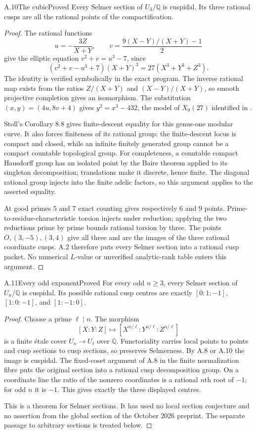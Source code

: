 \begin{statement}{A.10}{The cubic}{Proved}
Every Selmer section of $U_3/\mathbb Q$ is cuspidal. Its three rational
cusps are all the rational points of the compactification.
\end{statement}
\begin{proof}
The rational functions
\[
 u=-\frac{3Z}{X+Y},\qquad
 v=\frac{9(X-Y)/(X+Y)-1}{2}
\]
give the elliptic equation $v^2+v=u^3-7$, since
\[
 (v^2+v-u^3+7)(X+Y)^3=27(X^3+Y^3+Z^3).
\]
The identity is verified symbolically in the exact program. The inverse
rational map exists from the ratios $Z/(X+Y)$ and $(X-Y)/(X+Y)$, so
smooth projective completion gives an isomorphism. The substitution
$(x,y)=(4u,8v+4)$ gives $y^2=x^3-432$, the model of $X_0(27)$ identified
in \citet[\S10.1]{AMKrizLi2019}.

Stoll's Corollary 8.8 gives finite-descent equality for this genus-one
modular curve. It also forces finiteness of its rational group: the
finite-descent locus is compact and closed, while an infinite finitely
generated group cannot be a compact countable topological group. For
completeness, a countable compact Hausdorff group has an isolated point by
the Baire theorem applied to its singleton decomposition; translations
make it discrete, hence finite. The diagonal rational group injects into
the finite adelic factors, so this argument applies to the asserted
equality.

At good primes $5$ and $7$ exact counting gives respectively $6$ and $9$
points. Prime-to-residue-characteristic torsion injects under reduction;
applying the two reductions prime by prime bounds rational torsion by
three. The points $O,(3,-5),(3,4)$ give all three and are the images of
the three rational coordinate cusps. A.2 therefore puts every Selmer
section into a rational cusp packet. No numerical $L$-value or unverified
analytic-rank table enters this argument.
\end{proof}

\begin{statement}{A.11}{Every odd exponent}{Proved}
For every odd $n\geq3$, every Selmer section of $U_n/\mathbb Q$ is
cuspidal. Its possible rational cusp centres are exactly
$[0:1:-1]$, $[1:0:-1]$, and $[1:-1:0]$.
\end{statement}
\begin{proof}
Choose a prime $\ell\mid n$. The morphism
\[
 [X:Y:Z]\longmapsto
 [X^{n/\ell}:Y^{n/\ell}:Z^{n/\ell}]
\]
is a finite \'etale cover $U_n\to U_\ell$ over $\mathbb Q$.
Functoriality carries local points to points and cusp sections to cusp
sections, so preserves Selmerness. By A.8 or A.10 the image is cuspidal.
The fixed-coset argument of A.8 in the finite normalization fibre puts
the original section into a rational cusp decomposition group. On a
coordinate line the ratio of the nonzero coordinates is a rational
$n$th root of $-1$; for odd $n$ it is $-1$. This gives exactly the three
displayed centres.

This is a theorem for Selmer sections. It has used no local section
conjecture and no assertion from the global section of the October 2026
preprint. The separate passage to arbitrary sections is treated below.
\end{proof}


